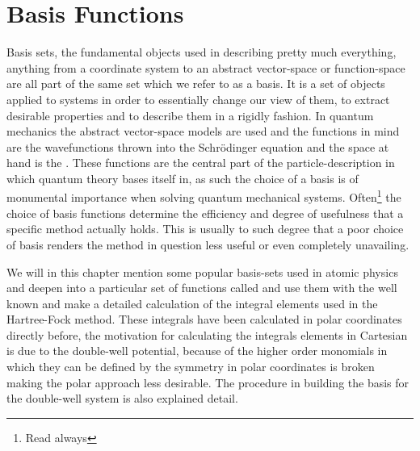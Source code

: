 \chapter{Basis Functions\label{chapter:3}}
    Basis sets, the fundamental objects used in describing pretty much
    everything, anything from a coordinate system to an abstract vector-space
    or function-space are all part of the same set which we refer to as a
    basis. It is a set of objects applied to systems in order to essentially
    change our view of them, to extract desirable properties and to describe
    them in a rigidly fashion. In quantum mechanics the abstract vector-space
    models are used and the functions in mind are the wavefunctions thrown into
    the Schrödinger equation and the space at hand is the .  These functions are the central part of the particle-description
    in which quantum theory bases itself in, as such the choice of a basis is
    of monumental importance when solving quantum mechanical systems.
    Often\footnote{Read always} the choice of basis functions determine the
    efficiency and degree of usefulness that a specific method actually holds.
    This is usually to such degree that a poor choice of basis renders the
    method in question less useful or even completely unavailing.

    We will in this chapter mention some popular basis-sets used in atomic
    physics and deepen into a particular set of functions called
     and use them with the well known
     and make a detailed calculation of the integral
    elements used in the Hartree-Fock method. These integrals have been
    calculated in polar coordinates directly before\cite{anisimovas}, the
    motivation for calculating the integrals elements in Cartesian is due to
    the double-well potential, because of the higher order monomials in which
    they can be defined by the symmetry in polar coordinates is broken making
    the polar approach less desirable. The procedure in building the basis for
    the double-well system is also explained detail.


